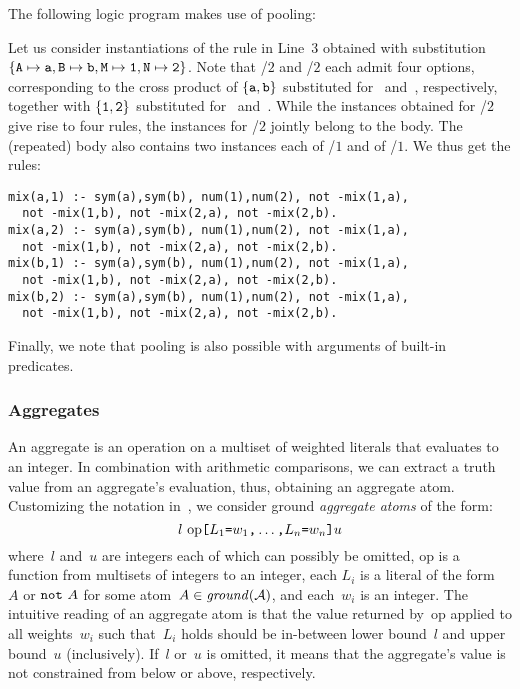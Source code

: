 \begin{example}\label{ex:pool}
The following logic program makes use of pooling:
%

%
Let us consider instantiations of the rule in Line~3 obtained with substitution 
$\{\var{A}\mapsto\const{a},\linebreak[1]\var{B}\mapsto\const{b},
   \var{M}\mapsto\const{1},\var{N}\mapsto\const{2}\}$.
Note that /$2$ and /$2$ each admit four options,
corresponding to the cross product of $\{\texttt{a},\texttt{b}\}$ substituted
for~ and~, respectively, together with $\{\texttt{1},\texttt{2}\}$
substituted for~ and~.
While the instances obtained for /$2$ give rise to four rules,
the instances for /$2$ jointly belong to the body.
The (repeated) body also contains two instances each of /$1$ and of /$1$.
We thus get the rules:%
%
\begin{lstlisting}[numbers=none]
mix(a,1) :- sym(a),sym(b), num(1),num(2), not -mix(1,a),
  not -mix(1,b), not -mix(2,a), not -mix(2,b).
mix(a,2) :- sym(a),sym(b), num(1),num(2), not -mix(1,a),
  not -mix(1,b), not -mix(2,a), not -mix(2,b).
mix(b,1) :- sym(a),sym(b), num(1),num(2), not -mix(1,a),
  not -mix(1,b), not -mix(2,a), not -mix(2,b).
mix(b,2) :- sym(a),sym(b), num(1),num(2), not -mix(1,a),
  not -mix(1,b), not -mix(2,a), not -mix(2,b).
\end{lstlisting}
%
Finally, we note that pooling is also possible with arguments of built-in predicates.
\eexample
\end{example}


\subsubsection{Aggregates}\label{subsec:gringo:aggregate}

An aggregate is an operation on a multiset of weighted literals that evaluates to an integer.
In combination with arithmetic comparisons, we can extract a truth value from
an aggregate's evaluation, thus, obtaining an aggregate atom.
Customizing the notation in~\cite{ferraris05a},
we consider ground \emph{aggregate atoms} of the form:
%
\begin{equation}\label{eq:aggregate:atom}
  l~ 
  \mathrm{op} 
  \texttt{[}
  L_1\texttt{=}w_1\texttt{,}
  \dots\texttt{,}
  L_n\texttt{=}w_n
  \texttt{]}
  u
\end{equation}
%
where~$l$ and~$u$ are integers each of which can possibly be omitted,
$\mathrm{op}$ is a function from multisets of integers to an integer,
each $L_i$ is a literal of the form~$A$ or $\texttt{not}~A$
for some atom~$A\in\mathit{ground}(\mathcal{A})$,
and each~$w_i$ is an integer.
The intuitive reading of an aggregate atom is that the value returned by~$\mathrm{op}$
applied to all weights~$w_i$ such that~$L_i$ holds should be in-between
lower bound~$l$ and upper bound~$u$ (inclusively).
If~$l$ or~$u$ is omitted,
it means that the aggregate's value is not constrained from below or above,
respectively.

